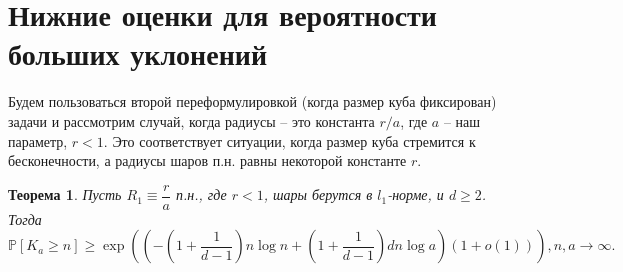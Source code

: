 \documentclass[12pt]{article}
\theoremstyle{plain}
\newtheorem{thm}{Теорема} %
\theoremstyle{definition}
\theoremstyle{remark}
\def\geq{\geqslant}
\newcommand{\PP}{\mathbb{P}}
\begin{document}
\section{Нижние оценки для вероятности больших уклонений}

Будем пользоваться второй переформулировкой (когда размер куба фиксирован) задачи и рассмотрим случай, когда радиусы -- это константа $r/a$, где $a$ -- наш параметр, $r<1$. Это соответствует ситуации, когда размер куба стремится к бесконечности, а радиусы шаров п.н. равны некоторой константе $r$.

\begin{thm}
Пусть $R_1\equiv \dfrac{r}{a}$ п.н., где $r<1$, шары берутся в $l_1$-норме, и $d\geq 2$. 
Тогда $$\PP[K_a \geq n] \geq \exp \left(\left(-\left(1+\dfrac{1}{d-1}\right)n\log n + \left(1+\dfrac{1}{d-1}\right)dn\log a\right) (1+o(1))\right), n, a\to \infty.$$
\end{thm}{}
\end{document}
